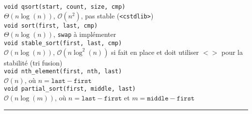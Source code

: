 \documentclass[landscape]{article}
\newcommand{\sep}{\noindent\rule{\linewidth}{0.4pt}}
\begin{document}
\begin{multicols*}{3}
        \noindent\lstinline[basicstyle=\ttfamily\color{cred}]{void qsort(start, count, size, cmp)}\\
    $\Theta(n\log(n))$, $\mathcal{O}(n^2)$, pas stable (\texttt{<cstdlib>})\\

        \noindent\lstinline[basicstyle=\ttfamily\color{cred}]{void sort(first, last, cmp)}\\
    $\Theta(n\log(n))$, \texttt{swap} à implémenter\\

        \noindent\lstinline[basicstyle=\ttfamily\color{cred}]{void stable_sort(first, last, cmp)}\\
    $\mathcal{O}(n\log(n))$, $\mathcal{O}(n\log^2(n))$ si fait en place et doit utiliser $< >$ pour la stabilité (tri fusion)\\

        \noindent\lstinline[basicstyle=\ttfamily\color{corange}]{void nth_element(first, nth, last)}\\
    $\mathcal{O}(n)$, où $n = \texttt{last} - \texttt{first}$\\

        \noindent\lstinline[basicstyle=\ttfamily\color{cred}]{void partial_sort(first, middle, last)}\\
    $\mathcal{O}(n\log(m))$, où $n = \texttt{last} - \texttt{first}$ et $m = \texttt{middle} - \texttt{first}$

        \sep

\end{multicols*}
\end{document}
